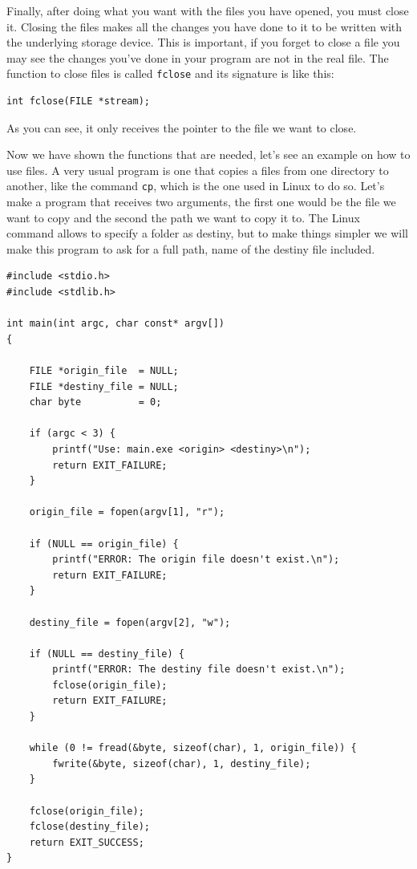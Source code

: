 \documentclass[a4paper]{article}
\begin{document}
Finally, after doing what you want with the files you have opened, you must
close it. Closing the files makes all the changes you have done to it to be
written with the underlying storage device. This is important, if you forget to
close a file you may see the changes you've done in your program are not
in the real file. The function to close files is called \verb!fclose! and its
signature is like this:

\noindent
\begin{minipage}[H]{\linewidth}
\mbox{}
\begin{lstlisting}[style=C,
caption={\texttt{fclose} signature},
label={lst:fcloseSignature}]
int fclose(FILE *stream);
\end{lstlisting}
\end{minipage}

As you can see, it only receives the pointer to the file we want to close.

Now we have shown the functions that are needed, let's see an example on how to
use files. A very usual program is one that copies a files from one directory to
another, like the command \verb!cp!, which is the one used in Linux to do so.
Let's make a program that receives two arguments, the first one would be the
file we want to copy and the second the path we want to copy it to. The Linux
command allows to specify a folder as destiny, but to make things
simpler we will make this program to ask for a full path, name of the destiny
file included.

\noindent
\begin{minipage}[H]{\linewidth}
\mbox{}
\begin{lstlisting}[style=C,
caption={Example of basic file management},
label={lst:fileBasic}]
#include <stdio.h>
#include <stdlib.h>

int main(int argc, char const* argv[])
{

    FILE *origin_file  = NULL;
    FILE *destiny_file = NULL;
    char byte          = 0;

    if (argc < 3) {
        printf("Use: main.exe <origin> <destiny>\n");
        return EXIT_FAILURE;
    }

    origin_file = fopen(argv[1], "r");

    if (NULL == origin_file) {
        printf("ERROR: The origin file doesn't exist.\n");
        return EXIT_FAILURE;
    }

    destiny_file = fopen(argv[2], "w");

    if (NULL == destiny_file) {
        printf("ERROR: The destiny file doesn't exist.\n");
        fclose(origin_file);
        return EXIT_FAILURE;
    }

    while (0 != fread(&byte, sizeof(char), 1, origin_file)) {
        fwrite(&byte, sizeof(char), 1, destiny_file);
    }

    fclose(origin_file);
    fclose(destiny_file);
    return EXIT_SUCCESS;
}

\end{lstlisting}
\end{minipage}
\end{document}
